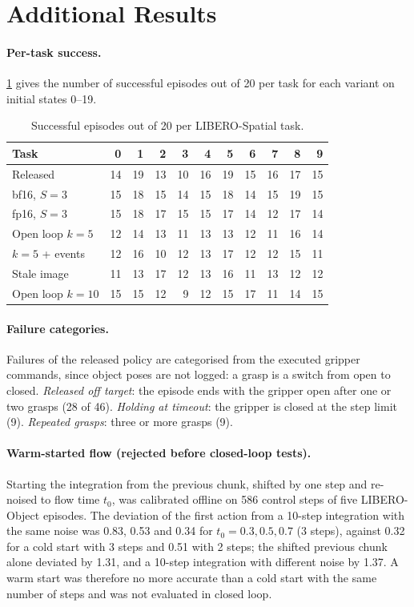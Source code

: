 \section{Additional Results}
\label{app:results}

\paragraph{Per-task success.}
\cref{tab:pertask} gives the number of successful episodes out of 20 per task for each variant on initial states 0--19.

\begin{table}[h]
\centering\small
\setlength{\tabcolsep}{3.2pt}
\begin{tabular}{@{}lrrrrrrrrrr@{}}
\toprule
Task & 0 & 1 & 2 & 3 & 4 & 5 & 6 & 7 & 8 & 9 \\
\midrule
Released & 14 & 19 & 13 & 10 & 16 & 19 & 15 & 16 & 17 & 15 \\
bf16, $S{=}3$ & 15 & 18 & 15 & 14 & 15 & 18 & 14 & 15 & 19 & 15 \\
fp16, $S{=}3$ & 15 & 18 & 17 & 15 & 15 & 17 & 14 & 12 & 17 & 14 \\
Open loop $k{=}5$ & 12 & 14 & 13 & 11 & 13 & 13 & 12 & 11 & 16 & 14 \\
$k{=}5$ + events & 12 & 16 & 10 & 12 & 13 & 17 & 12 & 12 & 15 & 11 \\
Stale image & 11 & 13 & 17 & 12 & 13 & 16 & 11 & 13 & 12 & 12 \\
Open loop $k{=}10$ & 15 & 15 & 12 & 9 & 12 & 15 & 17 & 11 & 14 & 15 \\
\bottomrule
\end{tabular}
\caption{Successful episodes out of 20 per LIBERO-Spatial task.}
\label{tab:pertask}
\end{table}

\paragraph{Failure categories.}
Failures of the released policy are categorised from the executed gripper commands, since object poses are not logged: a grasp is a switch from open to closed.
\emph{Released off target}: the episode ends with the gripper open after one or two grasps (28 of 46).
\emph{Holding at timeout}: the gripper is closed at the step limit (9).
\emph{Repeated grasps}: three or more grasps (9).

\paragraph{Warm-started flow (rejected before closed-loop tests).}
Starting the integration from the previous chunk, shifted by one step and re-noised to flow time $t_0$, was calibrated offline on 586 control steps of five LIBERO-Object episodes.
The deviation of the first action from a 10-step integration with the same noise was 0.83, 0.53 and 0.34 for $t_0=0.3, 0.5, 0.7$ (3 steps), against 0.32 for a cold start with 3 steps and 0.51 with 2 steps; the shifted previous chunk alone deviated by 1.31, and a 10-step integration with different noise by 1.37.
A warm start was therefore no more accurate than a cold start with the same number of steps and was not evaluated in closed loop.
